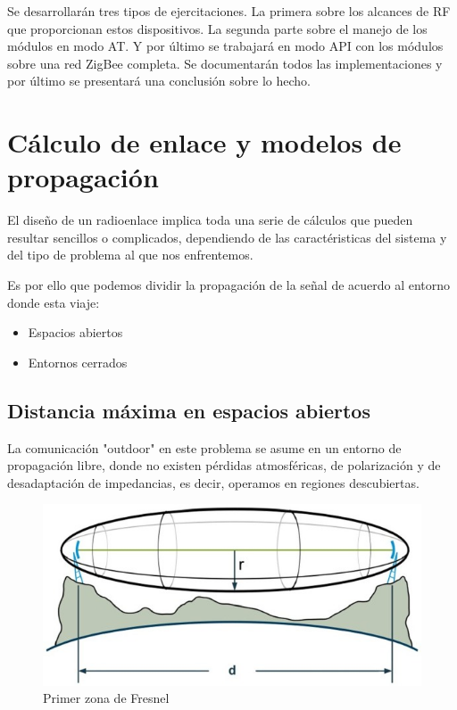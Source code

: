 \documentclass[11pt,oneside,spanish,a4paper]{article}
\begin{document}
Se desarrollarán tres tipos de ejercitaciones. La primera sobre los
alcances de RF que proporcionan estos dispositivos. La segunda parte
sobre el manejo de los módulos en modo AT. Y por último se trabajará
en modo API con los módulos sobre una red ZigBee completa. Se
documentarán todos las implementaciones y por último se presentará una
conclusión sobre lo hecho.

\section[Enlace y propagación]{C\'alculo de enlace y modelos de propagaci\'on}
\label{S:1}

El dise\~no de un radioenlace implica toda una serie de c\'alculos que pueden resultar sencillos o complicados, dependiendo de las caract\'eristicas del sistema y del tipo de problema al que nos enfrentemos.

Es por ello que podemos dividir la propagaci\'on de la se\~nal de acuerdo al entorno donde esta viaje: 

\begin{itemize}
\item Espacios abiertos 
\item Entornos cerrados
\end{itemize}


\subsection[Distancias]{Distancia m\'axima en espacios abiertos}

 La comunicaci\'on "outdoor" en este problema se asume en un entorno de propagaci\'on libre, donde no existen p\'erdidas atmosf\'ericas, de polarizaci\'on y de desadaptaci\'on de impedancias, es decir, operamos en regiones descubiertas. 
 
\begin{figure}[h]
	\centering\includegraphics[width=0.8\linewidth]{img/Image}
	\caption{Primer zona de Fresnel}
\end{figure}
\end{document}
